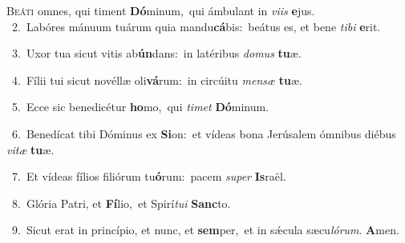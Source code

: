 \lettrine{\initial\textcolor{\initialcolor}{B}}{eáti} omnes, qui timent \textbf{Dó}\-minum,~\star qui ámbulant in \textit{vi}\-\textit{is} \textbf{e}\-jus.\\
{\numbfont\textcolor{\numbcolor}{~2.}}~Labóres mánuum tuárum quia mandu\-\textbf{cá}\-bis:~\star beátus es, et bene \textit{ti}\-\textit{bi} \textbf{e}\-rit.\par
{\numbfont\textcolor{\numbcolor}{~3.}}~Uxor tua sicut vitis ab\-\textbf{ún}\-dans:~\star in latéribus \textit{do}\-\textit{mus} \textbf{tu}\-æ.\par
{\numbfont\textcolor{\numbcolor}{~4.}}~Fílii tui sicut novéllæ oli\-\textbf{vá}\-rum:~\star in circúitu \textit{men}\-\textit{sæ} \textbf{tu}\-æ.\par
{\numbfont\textcolor{\numbcolor}{~5.}}~Ecce sic benedicétur \textbf{ho}\-mo,~\star qui \textit{ti}\-\textit{met} \textbf{Dó}\-minum.\par
{\numbfont\textcolor{\numbcolor}{~6.}}~Benedícat tibi Dóminus ex \textbf{Si}\-on:~\star et vídeas bona Jerúsalem ómnibus diébus \textit{vi}\-\textit{tæ} \textbf{tu}\-æ.\par
{\numbfont\textcolor{\numbcolor}{~7.}}~Et vídeas fílios filiórum tu\-\textbf{ó}\-rum:~\star pacem \textit{su}\-\textit{per} \textbf{Is}\-raël.\par
{\numbfont\textcolor{\numbcolor}{~8.}}~Glória Patri, et \textbf{Fí}\-lio,~\star et Spirí\-\textit{tu}\-\textit{i} \textbf{Sanc}\-to.\par
{\numbfont\textcolor{\numbcolor}{~9.}}~Sicut erat in princípio, et nunc, et \textbf{sem}\-per,~\star et in sǽcula sæcu\-\textit{ló}\-\textit{rum}. \textbf{A}\-men.\par
